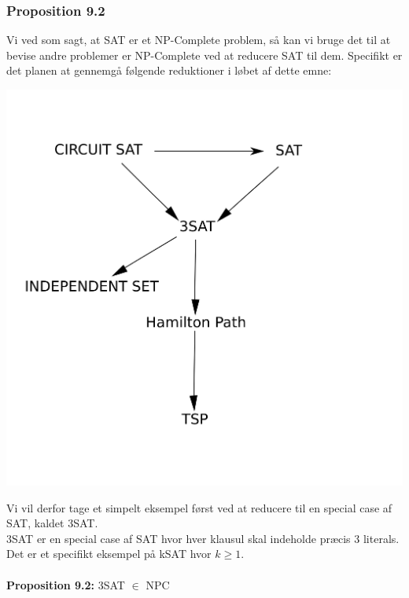 \subsubsection{Proposition 9.2}

Vi ved som sagt, at SAT er et NP-Complete problem, så kan vi bruge det til at
bevise andre problemer er NP-Complete ved at reducere SAT til dem.
Specifikt er det planen at gennemgå følgende reduktioner i løbet af dette emne:
\begin{center}
 \includegraphics[bb=0 0 400 400,scale=0.5]{./GraphReductionTree.png}
\end{center}

Vi vil derfor tage et simpelt eksempel først ved at reducere til en special
case af SAT, kaldet 3SAT.\\

3SAT er en special case af SAT hvor hver klausul skal indeholde præcis 3
literals. Det er et specifikt eksempel på kSAT hvor $k \geq 1$.\\
~\\
\textbf{Proposition 9.2:} 3SAT $\in$ NPC

